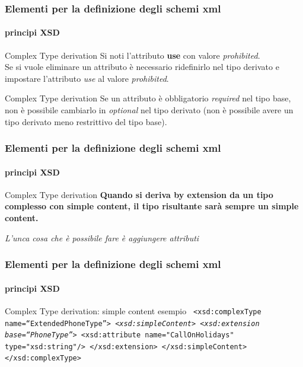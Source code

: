 \begin{frame}
	\frametitle{Elementi per la definizione degli schemi xml}
	\framesubtitle{principi XSD}
	\addtocounter{nframe}{1}

	\begin{block}{Complex Type derivation}
		Si noti l'attributo \textbf{use} con valore \textit{prohibited}.
		\\ Se si vuole eliminare un attributo è necessario ridefinirlo nel tipo derivato e impostare l'attributo \textit{use} al valore \textit{prohibited}.
	\end{block}

	\begin{block}{Complex Type derivation}
		Se un attributo è obbligatorio \textit{required} nel tipo base, non è possibile cambiarlo in \textit{optional} nel tipo derivato (non è possibile avere un tipo derivato meno restrittivo del tipo base).
	\end{block}
\end{frame}

\begin{frame}
	\frametitle{Elementi per la definizione degli schemi xml}
	\framesubtitle{principi XSD}
	\addtocounter{nframe}{1}

	\begin{block}{Complex Type derivation}
		\textbf{ Quando si deriva by extension da un tipo complesso con simple content, il tipo risultante sarà sempre un simple content.}
	\end{block}

	\textit{L'unca cosa che è possibile fare è aggiungere attributi}

\end{frame}


\begin{frame}
	\frametitle{Elementi per la definizione degli schemi xml}
	\framesubtitle{principi XSD}
	\addtocounter{nframe}{1}

	\begin{block}{Complex Type derivation: simple content esempio}
		\texttt{
			<xsd:complexType name=``ExtendedPhoneType''>
			\emph{<xsd:simpleContent>}
			\emph{<xsd:extension base=``PhoneType''>}
				<xsd:attribute name="CallOnHolidays" type="xsd:string"/>
			</xsd:extension>
			</xsd:simpleContent>
			</xsd:complexType>
		}
	\end{block}


\end{frame}



